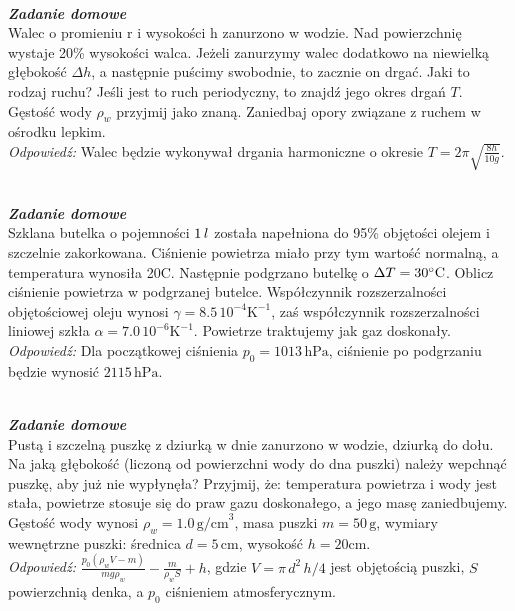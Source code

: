 \documentclass[11pt,a4paper]{article}
\newcounter{zaddom}\newcommand{\zaddom}[1][]{\addtocounter{zaddom}{1} ~\\  {\bf \emph{Zadanie domowe \arabic{zaddom} #1 }} \\}
\begin{document}
\newpage

\zaddom
Walec o promieniu r i wysokości h zanurzono w wodzie. Nad powierzchnię wystaje 20\% wysokości walca. Jeżeli zanurzymy walec dodatkowo na niewielką głębokość $\Delta h$, a następnie puścimy swobodnie, to zacznie on drgać. Jaki to rodzaj ruchu? Jeśli jest to ruch periodyczny, to znajdź jego okres drgań $T$. Gęstość wody $\rho_w$ przyjmij jako znaną. Zaniedbaj opory związane z ruchem w ośrodku lepkim.\\
{\em Odpowiedź:} Walec będzie wykonywał drgania harmoniczne o okresie $T = 2\pi \sqrt{\frac{8h}{10g}}$.

\zaddom
Szklana butelka o pojemności $1\textrm\,{l}$ została napełniona do 95\% objętości olejem i szczelnie zakorkowana. Ciśnienie powietrza miało przy tym wartość normalną, a temperatura wynosiła 20\degree C. Następnie podgrzano butelkę o $\Delta T = 30\degree\textrm{C}$. Oblicz ciśnienie powietrza w podgrzanej butelce. Współczynnik rozszerzalności objętościowej oleju wynosi $\gamma = 8.5\,10^{-4} \textrm{K}^{-1}$, zaś współczynnik rozszerzalności liniowej szkła $\alpha  = 7.0\,10^{-6} \textrm{K}^{-1}$. Powietrze traktujemy jak gaz doskonały.\\
{\em Odpowiedź:} Dla początkowej ciśnienia $p_0 = 1013\,\textrm{hPa}$, ciśnienie po podgrzaniu będzie wynosić $2115\,\textrm{hPa}$.

\zaddom
Pustą i szczelną puszkę z dziurką w dnie zanurzono w wodzie, dziurką do dołu. Na jaką głębokość (liczoną od powierzchni wody do dna puszki) należy wepchnąć puszkę, aby już nie wypłynęła? Przyjmij, że: temperatura powietrza i wody jest stała, powietrze stosuje się do praw gazu doskonałego, a jego masę zaniedbujemy. Gęstość wody wynosi $\rho_w = 1.0\,\textrm{g/cm}^3$, masa puszki $m = 50\,\textrm{g}$, wymiary wewnętrzne puszki: średnica $d = 5\,\textrm{cm}$, wysokość $h = 20\textrm{cm}$.\\
{\em Odpowiedź:} $\frac{p_0(\rho_w V-m)}{mg\rho_w} - \frac{m}{\rho_wS} + h$,
gdzie $V = \pi\,d^2\,h/4$ jest objętością puszki, $S$ powierzchnią denka, a $p_0$ ciśnieniem atmosferycznym.
\end{document}

